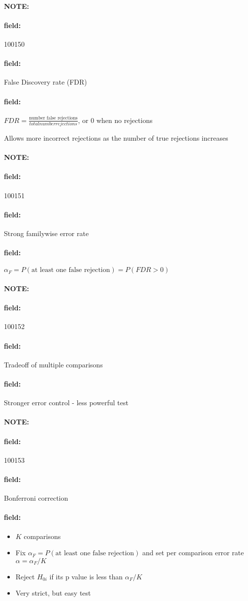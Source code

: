 \documentclass[12pt]{article}
\newenvironment{note}{\paragraph{NOTE:}}{}
\newenvironment{field}{\paragraph{field:}}{}
\begin{document}
\begin{note}
    \begin{field}
        \tiny 100150
    \end{field}
    \begin{field}
        False Discovery rate (FDR)
    \end{field}
    \begin{field}
        $FDR = \frac{\text{number false rejections}}{total number rejections}$,
        or 0 when no rejections

        Allows more incorrect rejections as the number of true rejections increases
    \end{field}
\end{note}



\begin{note}
    \begin{field}
        \tiny 100151
    \end{field}
    \begin{field}
        Strong familywise error rate
    \end{field}
    \begin{field}
        $\alpha_F = P(\text{at least one false rejection}) = P(FDR > 0)$
    \end{field}
\end{note}

\begin{note}
    \begin{field}
        \tiny 100152
    \end{field}
    \begin{field}
        Tradeoff of multiple comparisons
    \end{field}
    \begin{field}
        Stronger error control - less powerful test
    \end{field}
\end{note}

\begin{note}
    \begin{field}
        \tiny 100153
    \end{field}
    \begin{field}
        Bonferroni correction
    \end{field}
    \begin{field}
        \begin{itemize}
          \item $K$ comparisons
          \item Fix $\alpha_F = P(\text{at least one false rejection})$ and set per comparison error rate $\alpha = \alpha_F/K$
          \item Reject $H_{0i}$ if its p value is less than $\alpha_F/K$
          \item Very strict, but easy test
        \end{itemize}
    \end{field}
\end{note}
\end{document}
